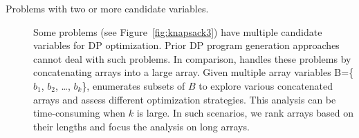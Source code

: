 \begin{description}
		\item[Problems with two or more candidate variables.] 
		Some problems (see Figure~\ref{fig:knapsack3}) have multiple candidate variables for DP optimization. 
		Prior DP program generation approaches~\cite{Moor1994Categories,Sauthoff2011Bellman,Morihata2014Dynamic} cannot deal with such problems. In comparison, \tool handles these problems by concatenating arrays into a large array. Given multiple array variables B=\{$b_1$, $b_2$, \ldots, $b_k$\}, \tool enumerates subsets of $B$ to explore various concatenated arrays and assess different optimization strategies. This analysis can be time-consuming when $k$ is large. In such scenarios, we rank arrays based on their lengths and focus the analysis on long arrays.
	\end{description}

